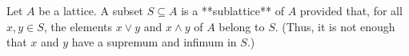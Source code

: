 Let $A$ be a lattice. A subset $S \subseteq A$ is a **sublattice** of $A$ provided that, for all $x, y \in S$, the elements $x \vee y$ and $x \wedge y$ of $A$ belong to $S$. (Thus, it is not enough that $x$ and $y$ have a supremum and infimum in $S$.)
